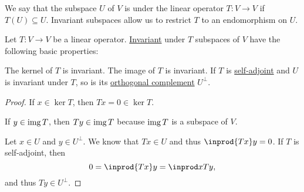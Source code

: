 \begin{definition}\label{def:invariant_subspace}
  We say that the subspace \( U \) of \( V \) is  under the linear operator \( T: V \to V \) if \( T(U) \subseteq U \). Invariant subspaces allow us to restrict \( T \) to an endomorphism on \( U \).
\end{definition}

\begin{proposition}\label{thm:def:invariant_subspace}
  Let \( T: V \to V \) be a linear operator. \hyperref[def:invariant_subspace]{Invariant} under \( T \) subspaces of \( V \) have the following basic properties:
  \begin{thmenum}
     The kernel of \( T \) is invariant.
     The image of \( T \) is invariant.
     If \( T \) is \hyperref[def:adjoint_operator]{self-adjoint} and \( U \) is invariant under \( T \), so is its \hyperref[def:orthogonal_complement]{orthogonal complement} \( U^\perp \).
  \end{thmenum}
\end{proposition}
\begin{proof}
   If \( x \in \ker T \), then \( Tx = 0 \in \ker T \).

   If \( y \in \operatorname{img} T \), then \( Ty \in \operatorname{img} T \) because \( \operatorname{img} T \) is a subspace of \( V \).

   Let \( x \in U \) and \( y \in U^\perp \). We know that \( Tx \in U \) and thus \( \inprod {Tx} y = 0 \). If \( T \) is self-adjoint, then
  \begin{equation*}
    0 = \inprod {Tx} y = \inprod x {Ty},
  \end{equation*}
  and thus \( Ty \in U^\perp \).
\end{proof}

